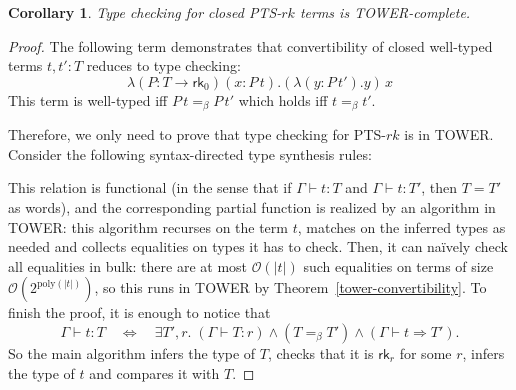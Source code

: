 \documentclass{article}
\newtheorem{corollary}{Corollary}
\theoremstyle{definition}
\theoremstyle{remark}
\begin{document}
\begin{corollary}
    Type checking for closed PTS-$rk$ terms is
    \textsc{TOWER}-complete.
\end{corollary}
\begin{proof}
    The following term demonstrates that convertibility
    of closed well-typed terms $t,t':T$ reduces to type
    checking:
    \[
        \lambda(P:T\to\mathsf{rk}_0)(x:P\,t).
        (\lambda(y:P\,t').y)\,x
    \]
    This term is well-typed iff $P\,t=_\beta P\,t'$
    which holds iff $t=_\beta t'$.

    Therefore, we only need to prove that type checking
    for PTS-$rk$ is in \textsc{TOWER}. Consider the
    following syntax-directed type synthesis rules:
    This relation is functional (in the sense that if
    $\Gamma\vdash t:T$ and $\Gamma\vdash t:T'$, then
    $T=T'$ as words), and the corresponding partial
    function is realized by an algorithm in
    \textsc{TOWER}: this algorithm recurses on the term
    $t$, matches on the inferred types as needed and
    collects equalities on types it has to check. Then,
    it can na\"ively check all equalities in bulk:
    there are at most $\mathcal{O}(|t|)$ such
    equalities on terms of size
    $\mathcal{O}(2^{\mathrm{poly}(|t|)})$, so this runs
    in \textsc{TOWER} by
    Theorem~\ref{tower-convertibility}.
    To finish the proof, it is enough to notice that
    \[
        \Gamma\vdash t:T\quad\Longleftrightarrow\quad
        \exists T',r.\;(\Gamma\vdash T:r)
        \land (T=_\beta T') \land
        (\Gamma\vdash t\Rightarrow T').
    \]
    So the main algorithm infers the type of $T$,
    checks that it is $\mathsf{rk}_r$ for some $r$,
    infers the type of $t$ and compares it with $T$.
\end{proof}
\end{document}
